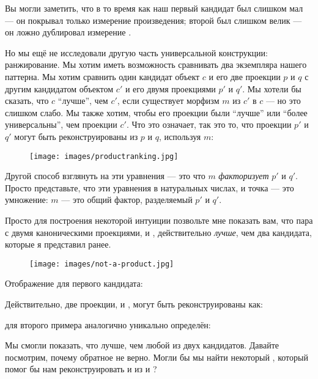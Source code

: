 Вы могли заметить, что в то время как наш первый кандидат был слишком мал --- он
покрывал только измерение  произведения; второй был
слишком велик --- он ложно дублировал измерение .

Но мы ещё не исследовали другую часть универсальной
конструкции: ранжирование. Мы хотим иметь возможность сравнивать два экземпляра
нашего паттерна. Мы хотим сравнить один кандидат объект $c$ и его
две проекции $p$ и $q$ с другим кандидатом объектом
$c'$ и его двумя проекциями $p'$ и $q'$. Мы хотели бы
сказать, что $c$ ``лучше'', чем $c'$, если существует морфизм
$m$ из $c'$ в $c$ --- но это слишком слабо. Мы также
хотим, чтобы его проекции были ``лучше'' или ``более универсальны'', чем
проекции $c'$. Что это означает, так это то, что проекции
$p'$ и $q'$ могут быть реконструированы из $p$ и $q$, используя $m$:


\begin{figure}[H]
  \centering
  \texttt{[image: images/productranking.jpg]}
\end{figure}

\noindent
Другой способ взглянуть на эти уравнения --- это что $m$
\emph{факторизует} $p'$ и $q'$. Просто представьте, что эти
уравнения в натуральных числах, и точка --- это умножение:
$m$ --- это общий фактор, разделяемый $p'$ и $q'$.

Просто для построения некоторой интуиции позвольте мне показать вам, что пара
 с двумя каноническими проекциями, 
и , действительно \emph{лучше}, чем два кандидата, которые я
представил ранее.

\begin{figure}[H]
  \centering
  \texttt{[image: images/not-a-product.jpg]}
\end{figure}

\noindent
Отображение  для первого кандидата:

Действительно, две проекции,  и , могут быть
реконструированы как:

 для второго примера аналогично уникально определён:

Мы смогли показать, что  лучше, чем любой из
двух кандидатов. Давайте посмотрим, почему обратное не верно. Могли бы мы
найти некоторый , который помог бы нам реконструировать 
и  из  и ?


